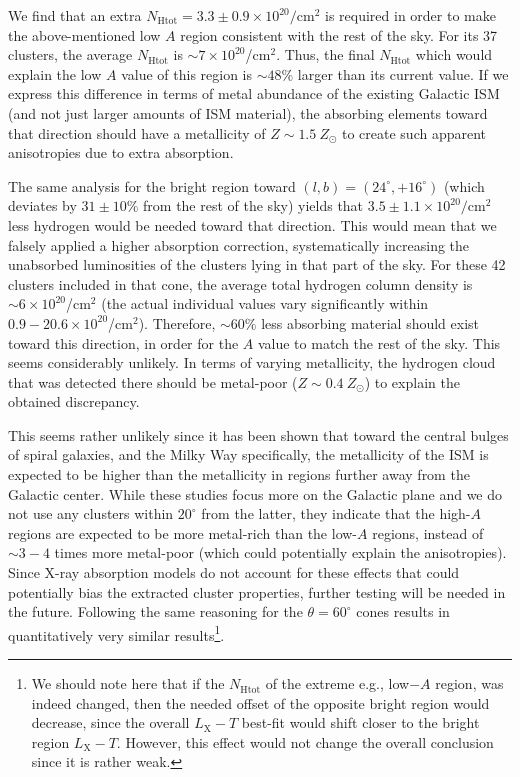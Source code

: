 \documentclass{aa}   %
\begin{document}
We find that an extra $N_{\text{Htot}}=3.3\pm 0.9\times 10^{20}/$cm$^2$ is required in order to make the above-mentioned low $A$ region consistent with the rest of the sky. For its 37 clusters, the average $N_{\text{Htot}}$ is $\sim 7\times 10^{20}$/cm$^2$. Thus, the final $N_{\text{Htot}}$ which would explain the low $A$ value of this region is $\sim 48\%$ larger than its current value. If we express this difference in terms of metal abundance of the existing Galactic ISM (and not just larger amounts of ISM material), the absorbing elements toward that direction should have a metallicity of $Z\sim 1.5\ Z_{\odot}$ to create such apparent anisotropies due to extra absorption.

The same analysis for the bright region toward $(l,b)=(24^{\circ}, +16^{\circ})$ (which deviates by $31\pm 10 \%$ from the rest of the sky) yields that $3.5\pm 1.1\times 10^{20}/$cm$^2$ less hydrogen would be needed toward that direction. This would mean that we falsely applied a higher absorption correction, systematically increasing the unabsorbed luminosities of the clusters lying in that part of the sky. For these 42 clusters included in that cone, the average total hydrogen column density is $\sim 6\times 10^{20}$/cm$^2$ (the actual individual values vary significantly within $0.9-20.6\times 10^{20}$/cm$^2$). Therefore, $\sim 60\%$ less absorbing material should exist toward this direction, in order for the $A$ value to match the rest of the sky. This seems considerably unlikely. In terms of varying metallicity, the hydrogen cloud that was detected there should be metal-poor ($Z\sim 0.4\ Z_{\odot}$) to explain the obtained discrepancy. 

This seems rather unlikely since it has been shown that toward the central bulges of spiral galaxies, and the Milky Way specifically, the metallicity of the ISM is expected to be higher \citep{boissier,schonrich,spina} than the metallicity in regions further away from the Galactic center. While these studies focus more on the Galactic plane and we do not use any clusters within $20^{\circ}$ from the latter, they indicate that the high-$A$ regions are expected to be more metal-rich than the low-$A$ regions, instead of $\sim 3-4$ times more metal-poor (which could potentially explain the anisotropies). Since X-ray absorption models do not account for these effects that could potentially bias the extracted cluster properties, further testing will be needed in the future. Following the same reasoning for the $\theta=60^{\circ}$ cones results in quantitatively very similar results\footnote{We should note here that if the $N_{\text{Htot}}$ of the extreme e.g., low$-A$ region, was indeed changed, then the needed offset of the opposite bright region would decrease, since the overall $L_{\text{X}}-T$ best-fit would shift closer to the bright region $L_{\text{X}}-T$. However, this effect would not change the overall conclusion since it is rather weak.}. 
\end{document}
